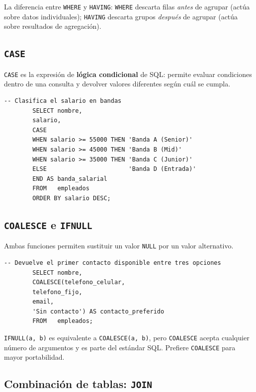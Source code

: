 \documentclass[12pt, a4paper]{article}
\begin{document}
	\begin{nota}
		La diferencia entre \texttt{WHERE} y \texttt{HAVING}:
		\texttt{WHERE} descarta filas \textit{antes} de agrupar
		(actúa sobre datos individuales);
		\texttt{HAVING} descarta grupos \textit{después} de agrupar
		(actúa sobre resultados de agregación).
	\end{nota}
	
	\subsection{\texttt{CASE}}
	
	\texttt{CASE} es la expresión de \textbf{lógica condicional} de SQL:
	permite evaluar condiciones dentro de una consulta y devolver
	valores diferentes según cuál se cumpla.
	
	\begin{lstlisting}[caption={CASE buscado (evalúa condiciones booleanas).}]
		-- Clasifica el salario en bandas
		SELECT nombre,
		salario,
		CASE
		WHEN salario >= 55000 THEN 'Banda A (Senior)'
		WHEN salario >= 45000 THEN 'Banda B (Mid)'
		WHEN salario >= 35000 THEN 'Banda C (Junior)'
		ELSE                       'Banda D (Entrada)'
		END AS banda_salarial
		FROM   empleados
		ORDER BY salario DESC;
	\end{lstlisting}
	
	\subsection{\texttt{COALESCE} e \texttt{IFNULL}}
	
	Ambas funciones permiten sustituir un valor \texttt{NULL} por un
	valor alternativo.
	
	\begin{lstlisting}[caption={COALESCE: devuelve el primer valor no NULL.}]
		-- Devuelve el primer contacto disponible entre tres opciones
		SELECT nombre,
		COALESCE(telefono_celular,
		telefono_fijo,
		email,
		'Sin contacto') AS contacto_preferido
		FROM   empleados;
	\end{lstlisting}
	
	\begin{nota}
		\texttt{IFNULL(a, b)} es equivalente a \texttt{COALESCE(a, b)},
		pero \texttt{COALESCE} acepta cualquier número de argumentos y
		es parte del estándar SQL.
		Prefiere \texttt{COALESCE} para mayor portabilidad.
	\end{nota}
	
	\subsection{Combinación de tablas: \texttt{JOIN}}
	
\end{document}
